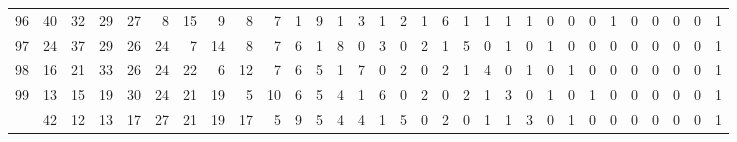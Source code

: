 \documentclass[
]{article}
\begin{document}
\begin{longtable}[t]{lrrrrrrrrrrrrrrrrrrrrrrrrrrrrrr}
96 & 40 & 32 & 29 & 27 & 8 & 15 & 9 & 8 & 7 & 1 & 9 & 1 & 3 & 1 & 2 & 1 & 6 & 1 & 1 & 1 & 1 & 0 & 0 & 0 & 1 & 0 & 0 & 0 & 0 & 1\\
97 & 24 & 37 & 29 & 26 & 24 & 7 & 14 & 8 & 7 & 6 & 1 & 8 & 0 & 3 & 0 & 2 & 1 & 5 & 0 & 1 & 0 & 1 & 0 & 0 & 0 & 0 & 0 & 0 & 0 & 1\\
98 & 16 & 21 & 33 & 26 & 24 & 22 & 6 & 12 & 7 & 6 & 5 & 1 & 7 & 0 & 2 & 0 & 2 & 1 & 4 & 0 & 1 & 0 & 1 & 0 & 0 & 0 & 0 & 0 & 0 & 1\\
99 & 13 & 15 & 19 & 30 & 24 & 21 & 19 & 5 & 10 & 6 & 5 & 4 & 1 & 6 & 0 & 2 & 0 & 2 & 1 & 3 & 0 & 1 & 0 & 1 & 0 & 0 & 0 & 0 & 0 & 1\\
\addlinespace
100 & 42 & 12 & 13 & 17 & 27 & 21 & 19 & 17 & 5 & 9 & 5 & 4 & 4 & 1 & 5 & 0 & 2 & 0 & 1 & 1 & 3 & 0 & 1 & 0 & 0 & 0 & 0 & 0 & 0 & 1\\*
\end{longtable}
\end{document}
